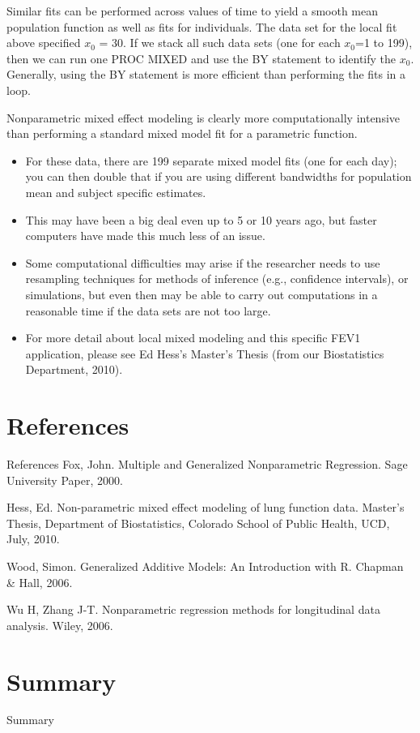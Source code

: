 \documentclass[
  9pt,
  ignorenonframetext,
]{beamer}
\begin{document}
\begin{frame}{}
\protect\hypertarget{section-12}{}
Similar fits can be performed across values of time to yield a smooth
mean population function as well as fits for individuals. The data set
for the local fit above specified \(x_0\) = 30. If we stack all such
data sets (one for each \(x_0\)=1 to 199), then we can run one PROC
MIXED and use the BY statement to identify the \(x_0\). Generally, using
the BY statement is more efficient than performing the fits in a loop.
\end{frame}

\begin{frame}{}
\protect\hypertarget{section-13}{}
Nonparametric mixed effect modeling is clearly more computationally
intensive than performing a standard mixed model fit for a parametric
function.

\begin{itemize}
\item
  For these data, there are 199 separate mixed model fits (one for each
  day); you can then double that if you are using different bandwidths
  for population mean and subject specific estimates.
\item
  This may have been a big deal even up to 5 or 10 years ago, but faster
  computers have made this much less of an issue.
\item
  Some computational difficulties may arise if the researcher needs to
  use resampling techniques for methods of inference (e.g., confidence
  intervals), or simulations, but even then may be able to carry out
  computations in a reasonable time if the data sets are not too large.
\item
  For more detail about local mixed modeling and this specific FEV1
  application, please see Ed Hess's Master's Thesis (from our
  Biostatistics Department, 2010).
\end{itemize}
\end{frame}

\hypertarget{references}{%
\section{References}\label{references}}

\begin{frame}{References}
\protect\hypertarget{references-1}{}
Fox, John. Multiple and Generalized Nonparametric Regression. Sage
University Paper, 2000.

Hess, Ed. Non-parametric mixed effect modeling of lung function data.
Master's Thesis, Department of Biostatistics, Colorado School of Public
Health, UCD, July, 2010.

Wood, Simon. Generalized Additive Models: An Introduction with R.
Chapman \& Hall, 2006.

Wu H, Zhang J-T. Nonparametric regression methods for longitudinal data
analysis. Wiley, 2006.
\end{frame}

\hypertarget{summary}{%
\section{Summary}\label{summary}}

\begin{frame}{Summary}
\protect\hypertarget{summary-1}{}
\end{frame}
\end{document}
